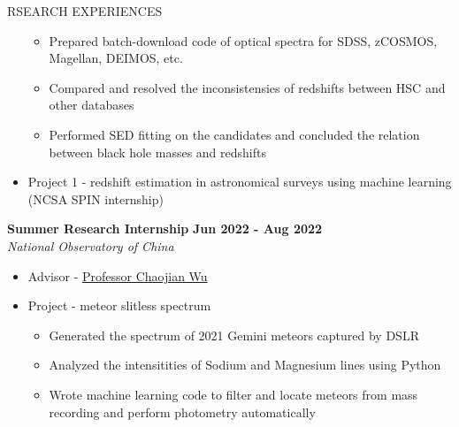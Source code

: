 \documentclass[10pt]{article} %
\begin{document}
\begin{section}{RSEARCH EXPERIENCES}
\begin{itemize}[leftmargin=1.5em]
\begin{itemize}[leftmargin=1.5em]
        \item Prepared batch-download code of optical spectra for SDSS, zCOSMOS, Magellan, DEIMOS, etc. 
        \item Compared and resolved the inconsistensies of redshifts between HSC and other databases
        \item Performed SED fitting on the candidates and concluded the relation between black hole masses and redshifts
    \end{itemize}
    \item Project 1 - redshift estimation in astronomical surveys using machine learning (NCSA SPIN internship)
\end{itemize}

\textbf{Summer Research Internship} \hfill \textbf{Jun 2022 - Aug 2022} \\
\textit{National Observatory of China}
\begin{itemize}[leftmargin=1.5em]
    \item Advisor - \href{mailto:chjwu@bao.ac.cn}{Professor Chaojian Wu}
    \item Project - meteor slitless spectrum
    \begin{itemize}[leftmargin=1.5em]
        \item Generated the spectrum of 2021 Gemini meteors captured by DSLR
        \item Analyzed the intensitities of Sodium and Magnesium lines using Python
        \item Wrote machine learning code to filter and locate meteors from mass recording and perform photometry automatically
    \end{itemize}
\end{itemize}

\newpage


\end{section}
\end{document}
